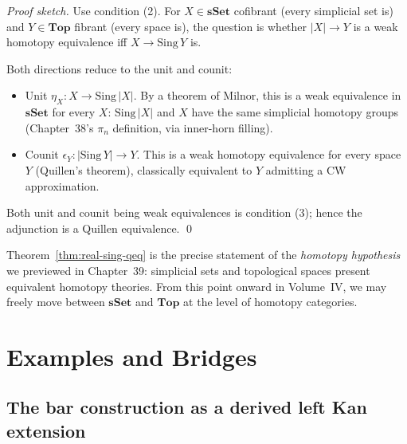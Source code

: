 \begin{proof}[Proof sketch]
Use condition (2). For $X \in \mathbf{sSet}$ cofibrant (every simplicial
set is) and $Y \in \mathbf{Top}$ fibrant (every space is), the question
is whether $\lvert X\rvert \to Y$ is a weak homotopy equivalence iff
$X \to \mathrm{Sing}\, Y$ is.

Both directions reduce to the unit and counit:
\begin{itemize}
  \item Unit $\eta_X : X \to \mathrm{Sing}\,\lvert X\rvert$. By a theorem of
        Milnor, this is a weak equivalence in $\mathbf{sSet}$ for every $X$:
        $\mathrm{Sing}\,\lvert X\rvert$ and $X$ have the same simplicial
        homotopy groups (Chapter~38's $\pi_n$ definition, via inner-horn
        filling).
  \item Counit $\epsilon_Y : \lvert\mathrm{Sing}\, Y\rvert \to Y$. This is
        a weak homotopy equivalence for every space $Y$ (Quillen's
        theorem), classically equivalent to $Y$ admitting a CW
        approximation.
\end{itemize}
Both unit and counit being weak equivalences is condition (3); hence the
adjunction is a Quillen equivalence. \qed
\end{proof}

\begin{remark}
Theorem~\ref{thm:real-sing-qeq} is the precise statement of the
\emph{homotopy hypothesis} we previewed in Chapter~39: simplicial sets
and topological spaces present equivalent homotopy theories. From this
point onward in Volume~IV, we may freely move between $\mathbf{sSet}$
and $\mathbf{Top}$ at the level of homotopy categories.
\end{remark}


\section{Examples and Bridges}
\label{sec:bridges}

\subsection{The bar construction as a derived left Kan extension}

